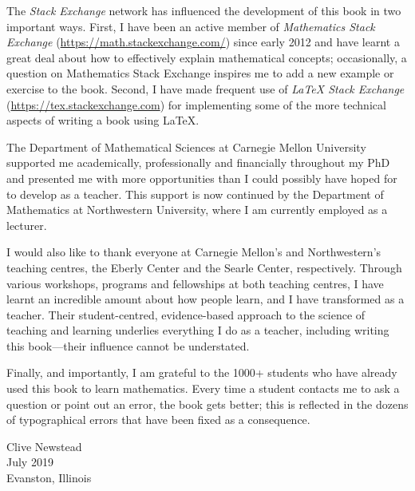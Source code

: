 The \textit{Stack Exchange} network has influenced the development of this book in two important ways. First, I have been an active member of \textit{Mathematics Stack Exchange} (\url{https://math.stackexchange.com/}) since early 2012 and have learnt a great deal about how to effectively explain mathematical concepts; occasionally, a question on Mathematics Stack Exchange inspires me to add a new example or exercise to the book. Second, I have made frequent use of \textit{\LaTeX{} Stack Exchange} (\url{https://tex.stackexchange.com}) for implementing some of the more technical aspects of writing a book using \LaTeX{}.

The Department of Mathematical Sciences at Carnegie Mellon University supported me academically, professionally and financially throughout my PhD and presented me with more opportunities than I could possibly have hoped for to develop as a teacher. This support is now continued by the Department of Mathematics at Northwestern University, where I am currently employed as a lecturer.

I would also like to thank everyone at Carnegie Mellon's and Northwestern's teaching centres, the Eberly Center and the Searle Center, respectively. Through various workshops, programs and fellowships at both teaching centres, I have learnt an incredible amount about how people learn, and I have transformed as a teacher. Their student-centred, evidence-based approach to the science of teaching and learning underlies everything I do as a teacher, including writing this book---their influence cannot be understated.

Finally, and importantly, I am grateful to the 1000+ students who have already used this book to learn mathematics. Every time a student contacts me to ask a question or point out an error, the book gets better; this is reflected in the dozens of typographical errors that have been fixed as a consequence.

\begin{flushright}
Clive Newstead\\
July 2019\\
Evanston, Illinois
\end{flushright}